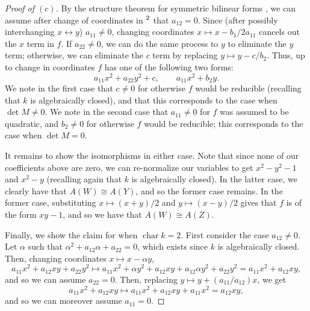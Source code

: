 \documentclass[12pt,letterpaper]{article}
\theoremstyle{definition}
\theoremstyle{remark}
\numberwithin{equation}{section}
\numberwithin{figure}{problem}
\let\AA\relax
\DeclareMathOperator{\AA}{\mathbb{A}}
\DeclareMathOperator{\Char}{char}
\begin{document}
\begin{proof}[Proof of $(c)$]
  By the structure theorem for symmetric bilinear forms
  \cite[Ch.~XV, Thm.~3.1]{Lan02}, we can assume after change of coordinates
  in $\AA^2$ that $a_{12} = 0$.
  Since (after possibly interchanging $x \leftrightarrow y$) $a_{11} \ne 0$,
  changing coordinates $x \mapsto x - b_1/2a_{11}$ cancels out the $x$ term in
  $f$.
  If $a_{22} \ne 0$, we can do the same process to $y$ to eliminate the $y$
  term; otherwise, we can eliminate the $c$ term by replacing
  $y \mapsto y - c/b_2$.
  Thus, up to change in coordinates $f$ has one of the following two forms:
  \begin{equation*}
    a_{11}x^2 + a_{22}y^2 + c, \qquad a_{11}x^2 + b_2y.
  \end{equation*}
  We note in the first case that $c \ne 0$ for otherwise $f$ would be
  reducible (recalling that $k$ is algebraically closed), and that this
  corresponds to the case when $\det M \ne 0$.
  We note in the second case that $a_{11} \ne 0$ for $f$ was assumed to be
  quadratic, and $b_2 \ne 0$ for otherwise $f$ would be reducible; this
  corresponds to the case when $\det M = 0$.
  \par It remains to show the isomorphisms in either case.
  Note that since none of our coefficients above are zero, we can re-normalize
  our variables to get $x^2 - y^2 - 1$ and $x^2 - y$ (recalling again that $k$
  is algebraically closed).
  In the latter case, we clearly have that $A(W) \cong A(Y)$, and so the former
  case remains.
  In the former case, substituting $x \mapsto (x+y)/2$ and $y \mapsto (x-y)/2$
  gives that $f$ is of the form $xy - 1$, and so we have that $A(W) \cong A(Z)$.
  \par Finally, we show the claim for when $\Char k = 2$. First consider the
  case $a_{12} \ne 0$. Let $\alpha$ such that
  $\alpha^2 + a_{12}\alpha + a_{22} = 0$, which exists since $k$ is
  algebraically closed.
  Then, changing coordinates $x \mapsto x - \alpha y$,
  \begin{equation*}
    a_{11}x^2 + a_{12}xy + a_{22}y^2 \mapsto a_{11}x^2 + \alpha y^2 + a_{12}xy + a_{12}\alpha y^2 + a_{22}y^2 = a_{11}x^2 + a_{12}xy,
  \end{equation*}
  and so we can assume $a_{22} = 0$.
  Then, replacing $y \mapsto y + (a_{11}/a_{12})x$, we get
  \begin{equation*}
    a_{11}x^2 + a_{12}xy \mapsto a_{11}x^2 + a_{12}xy + a_{11}x^2 = a_{12}xy,
  \end{equation*}
  and so we can moreover assume $a_{11} = 0$.

\end{proof}
\end{document}
